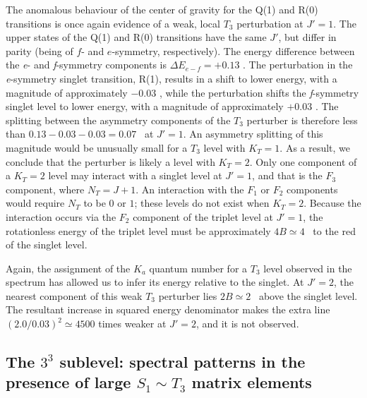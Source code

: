 The anomalous behaviour of the center of gravity for the Q(1) and R(0)
transitions is once again evidence of a weak, local $T_3$ perturbation
at $J'=1$.  The upper states of the Q(1) and R(0) transitions have the
same $J'$, but differ in parity (being of $f$- and $e$-symmetry,
respectively).  The energy difference between the \emph{e}- and
\emph{f}-symmetry components is $\Delta E_{e-f}=+0.13$ \rcm.  The
perturbation in the \emph{e}-symmetry singlet transition, R(1),
results in a shift to lower energy, with a magnitude of approximately
$-0.03$ \rcm, while the perturbation shifts the \emph{f}-symmetry
singlet level to lower energy, with a magnitude of approximately
$+0.03$ \rcm.  The splitting between the asymmetry components of the
$T_3$ perturber is therefore less than $0.13-0.03-0.03=0.07$ \rcm\ at
$J'=1$.  An asymmetry splitting of this magnitude would be unusually
small for a $T_3$ level with $K_T=1$.  As a result, we conclude that
the perturber is likely a level with $K_T=2$.  Only one component of a
$K_T=2$ level may interact with a singlet level at $J'=1$, and that is
the $F_3$ component, where $N_T=J+1$.  An interaction with the $F_1$
or $F_2$ components would require $N_T$ to be $0$ or $1$; these levels
do not exist when $K_T=2$.  Because the interaction occurs via the
$F_2$ component of the triplet level at $J'=1$, the rotationless
energy of the triplet level must be approximately $4B \simeq 4$ \rcm\
to the red of the singlet level.

Again, the assignment of the $K_a$ quantum number for a $T_3$ level
observed in the spectrum has allowed us to infer its energy relative
to the singlet.  At $J'=2$, the nearest component of this weak $T_3$
perturber lies $2B \simeq 2$ \rcm\ above the singlet level.  The
resultant increase in squared energy denominator makes the
extra line $(2.0/0.03)^2 \simeq 4500$ times weaker at $J'=2$, and it
is not observed.

%
% 











\subsection{The $3^3$  sublevel: spectral patterns in the
  presence of large $S_1 \sim T_3$ matrix elements}

